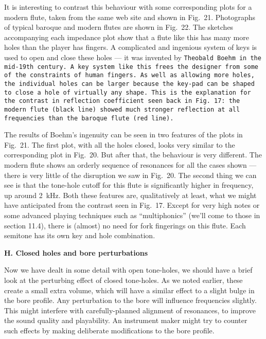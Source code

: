   It is interesting to contrast this behaviour with some corresponding plots 
  for a modern flute, taken from the same web site and shown in Fig.\ 21. 
  Photographs of typical baroque and modern flutes are shown in Fig.\ 22. The 
  sketches accompanying each impedance plot show that a flute like this has 
  many more holes than the player has fingers. A complicated and ingenious 
  system of keys is used to open and close these holes — it was invented by 
  \tt{}Theobald Boehm\rm{} in the mid-19th century. A key system like this 
  frees the designer from some of the constraints of human fingers. As well as 
  allowing more holes, the individual holes can be larger because the key-pad 
  can be shaped to close a hole of virtually any shape. This is the explanation 
  for the contrast in reflection coefficient seen back in Fig.\ 17: the modern 
  flute (black line) showed much stronger reflection at all frequencies than 
  the baroque flute (red line). 





  The results of Boehm’s ingenuity can be seen in two features of the plots in 
  Fig.\ 21. The first plot, with all the holes closed, looks very similar to 
  the corresponding plot in Fig.\ 20. But after that, the behaviour is very 
  different. The modern flute shows an orderly sequence of resonances for all 
  the cases shown — there is very little of the disruption we saw in Fig.\ 20. 
  The second thing we can see is that the tone-hole cutoff for this flute is 
  significantly higher in frequency, up around 2~kHz. Both these features are, 
  qualitatively at least, what we might have anticipated from the contrast seen 
  in Fig.\ 17. Except for very high notes or some advanced playing techniques 
  such as “multiphonics” (we’ll come to those in section 11.4), there is 
  (almost) no need for fork fingerings on this flute. Each semitone has its own 
  key and hole combination. 



  \textbf{H. Closed holes and bore perturbations} 

  Now we have dealt in some detail with open tone-holes, we should have a brief 
  look at the perturbing effect of closed tone-holes. As we noted earlier, 
  these create a small extra volume, which will have a similar effect to a 
  slight bulge in the bore profile. Any perturbation to the bore will influence 
  frequencies slightly. This might interfere with carefully-planned alignment 
  of resonances, to improve the sound quality and playability. An instrument 
  maker might try to counter such effects by making deliberate modifications to 
  the bore profile. 

